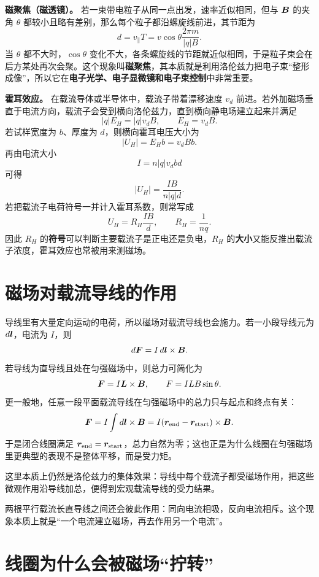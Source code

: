 \documentclass[lang=cn,11pt]{elegantbook}
\begin{document}
\textbf{磁聚焦（磁透镜）。} 若一束带电粒子从同一点出发，速率近似相同，但与 \(\vb*{B}\) 的夹角 \(\theta\) 都较小且略有差别，那么每个粒子都沿螺旋线前进，其节距为
\[
d=v_\parallel T
=v\cos\theta\frac{2\pi m}{|q|B}.
\]
当 \(\theta\) 都不大时，\(\cos\theta\) 变化不大，各条螺旋线的节距就近似相同，于是粒子束会在后方某处再次会聚。这个现象叫\textbf{磁聚焦}，其本质就是利用洛伦兹力把电子束“整形成像”，所以它在\textbf{电子光学、电子显微镜和电子束控制}中非常重要。

\textbf{霍耳效应。} 在载流导体或半导体中，载流子带着漂移速度 \(v_d\) 前进。若外加磁场垂直于电流方向，载流子会受到横向洛伦兹力，直到横向静电场建立起来并满足
\[
|q|E_H=|q|v_dB,
\qquad
E_H=v_dB.
\]
若试样宽度为 \(b\)、厚度为 \(d\)，则横向霍耳电压大小为
\[
|U_H|=E_Hb=v_dBb.
\]
再由电流大小
\[
I=n|q|v_dbd
\]
可得
\[
|U_H|=\frac{IB}{n|q|d}.
\]
若把载流子电荷符号一并计入霍耳系数，则常写成
\[
U_H=R_H\frac{IB}{d},
\qquad
R_H=\frac{1}{nq}.
\]
因此 \(R_H\) 的\textbf{符号}可以判断主要载流子是正电还是负电，\(R_H\) 的\textbf{大小}又能反推出载流子浓度，霍耳效应也常被用来测磁场。

\section{磁场对载流导线的作用}

导线里有大量定向运动的电荷，所以磁场对载流导线也会施力。若一小段导线元为 \(d\vb*{l}\)，电流为 \(I\)，则
\[
d\vb*{F}=I\,d\vb*{l}\times \vb*{B}.
\]
若导线为直导线且处在匀强磁场中，则总力可简化为
\[
\vb*{F}=I\vb*{L}\times \vb*{B},
\qquad
F=ILB\sin\theta.
\]
更一般地，任意一段平面载流导线在匀强磁场中的总力只与起点和终点有关：
\[
\vb*{F}
=I\int d\vb*{l}\times \vb*{B}
=I(\vb*{r}_{\mathrm{end}}-\vb*{r}_{\mathrm{start}})\times \vb*{B}.
\]
于是闭合线圈满足 \(\vb*{r}_{\mathrm{end}}=\vb*{r}_{\mathrm{start}}\)，总力自然为零；这也正是为什么线圈在匀强磁场里更典型的表现不是整体平移，而是受力矩。

这里本质上仍然是洛伦兹力的集体效果：导线中每个载流子都受磁场作用，把这些微观作用沿导线加总，便得到宏观载流导线的受力结果。

\begin{remark}
两根平行载流长直导线之间还会彼此作用：同向电流相吸，反向电流相斥。这个现象本质上就是“一个电流建立磁场，再去作用另一个电流”。
\end{remark}

\section{线圈为什么会被磁场“拧转”}
\end{document}
